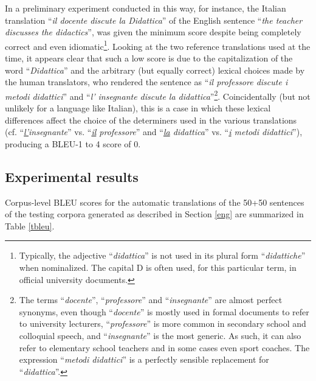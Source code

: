 In a preliminary experiment conducted in this way, for instance, the Italian translation ``\textit{il docente discute la Didattica}'' of the English sentence ``\textit{the teacher discusses the didactics}'', was given the minimum score despite being completely correct and even idiomatic\footnote{Typically, the adjective ``\textit{didattica}'' is not used in its plural form ``\textit{didattiche}'' when nominalized. The capital D is often used, for this particular term, in official university documents.}. 
Looking at the two reference translations used at the time, it appears clear that such a low score is due to the capitalization of the word ``\textit{Didattica}'' and the arbitrary (but equally correct) lexical choices made by the human translators, who rendered the sentence as ``\textit{il professore discute i metodi didattici}'' and ``\textit{l' insegnante discute la didattica}''\footnote{The terms ``\textit{docente}'', ``\textit{professore}'' and ``\textit{insegnante}'' are almost perfect synonyms, even though ``\textit{docente}'' is mostly used in formal documents to refer to university lecturers, ``\textit{professore}'' is more common in secondary school and colloquial speech, and ``\textit{insegnante}'' is the most generic. As such, it can also refer to elementary school teachers and in some cases even sport coaches. The expression ``\textit{metodi didattici}'' is a perfectly sensible replacement for ``\textit{didattica}''.}. 
Coincidentally (but not unlikely for a language like Italian), this is a case in which these lexical differences affect the choice of the determiners used in the various translations (cf. ``\textit{\underline{l'}insegnante}'' vs. ``\textit{\underline{il} professore}'' and ``\textit{\underline{la} didattica}'' vs. ``\textit{\underline{i} metodi didattici}''), producing a BLEU-1 to 4 score of 0. \smallskip

\subsection{Experimental results} \label{res5}
Corpus-level BLEU scores for the automatic translations of the 50+50 sentences of the testing corpora generated as described in Section \ref{eng} are summarized in Table \ref{tbleu}.

